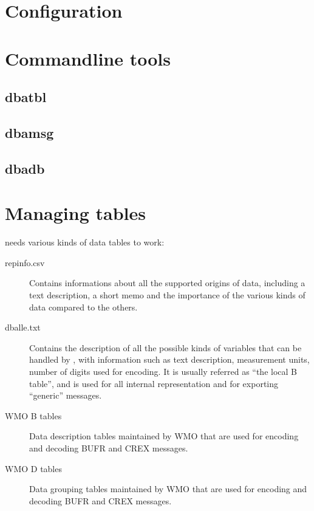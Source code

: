 \section {Configuration}



\section {Commandline tools}

\subsection{dbatbl}

\subsection{dbamsg}

\subsection{dbadb}

\section {Managing tables}

\dballe{} needs various kinds of data tables to work:

\begin{description}
\item[repinfo.csv]
  Contains informations about all the supported origins of data, including a
  text description, a short memo and the importance of the various kinds of
  data compared to the others.
\item[dballe.txt]
  Contains the description of all the possible kinds of variables that can be
  handled by \dballe{}, with information such as text description, measurement
  units, number of digits used for encoding.  It is usually referred as ``the
  local B table'', and is used for all internal representation and for
  exporting ``generic'' messages.
\item[WMO B tables]
  Data description tables maintained by WMO that are used for encoding and
  decoding BUFR and CREX messages.
\item[WMO D tables]
  Data grouping tables maintained by WMO that are used for encoding and
  decoding BUFR and CREX messages.
\end{description}

